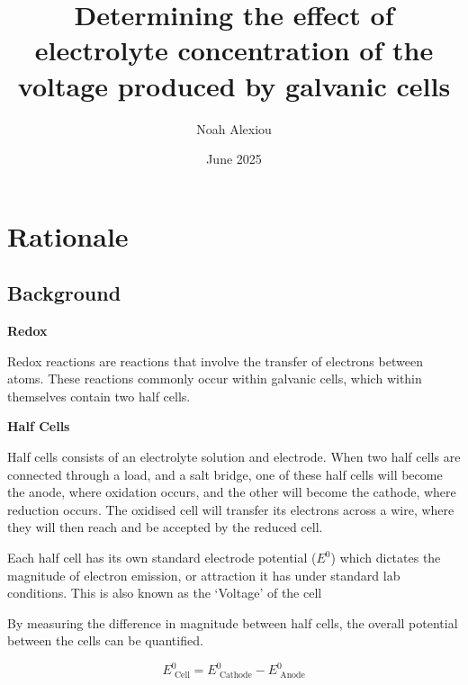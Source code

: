\documentclass[11pt,a4paper]{article}
\begin{document}
	\nocite{*}
	
	\begin{titlepage}
		
		
		\title{Determining the effect of electrolyte concentration of the voltage produced by galvanic cells}
		
		\author{Noah Alexiou}
		
		
		\date{June 2025}
		
		\maketitle
		\centering
		
	\end{titlepage}
	\tableofcontents
	\newpage
	
	
	\section{Rationale}
	
	
	\subsection{Background}

	

	\textbf{Redox}
	
	Redox reactions are reactions that involve the transfer of electrons between atoms. These reactions commonly occur within galvanic cells, which within themselves contain two half cells. 
	

	\textbf{Half Cells}
	
	Half cells consists of an electrolyte solution and electrode. When two half cells are connected through a load, and a salt  bridge, one of these half cells will become the anode, where oxidation occurs, and the other will become the cathode, where reduction occurs. The oxidised cell will transfer its electrons across a wire, where they will then reach and be accepted by the reduced cell.
	
	Each half cell has its own standard electrode potential ($E^0$) which dictates the magnitude of electron emission, or attraction it has under standard lab conditions. This is also known as the `Voltage' of the cell
	
	By measuring the difference in magnitude between half cells, the overall potential between the cells can be quantified. 
	
	$$
	E^0_{\textrm{ Cell}}=E^0_{\textrm{ Cathode}}-E^0_{\textrm{ Anode}}
	$$
	
\end{document}
